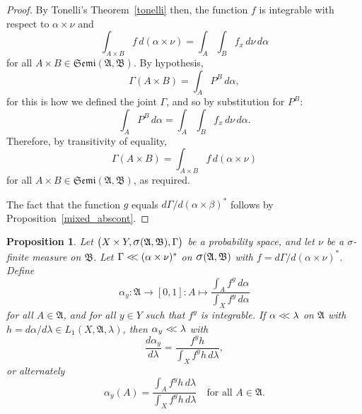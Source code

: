 \documentclass[
twoside=true,
paper=letter,
fontsize=11pt,
pagesize=auto,
leqno,
openany,
headsepline,
overfullrule,
]{scrbook}
\theoremstyle{plain}
\theoremstyle{plain}
\newtheorem{prop}[thm]{Proposition}
\theoremstyle{definition}
\theoremstyle{bfnoteitalic}
\theoremstyle{bfnoteroman}
\newcommand{\sigalg}[1]{\mathfrak{#1}}
\newcommand{\sagb}{\mathop{\hbox{\large{$\sigma$}}}\nolimits}
\newcommand{\textsigma}{\hbox{\large{$\sigma$}}\kern-1pt}
\newcommand{\sigmaalgebra}{\sigalg{A}}
\newcommand{\productsemiring}[2]{\mathfrak{Semi}(#1,#2)}
\newcommand{\productsig}[2]{\sagb(#1,#2)}
\newcommand{\funcf}{f}
\newcommand{\funcg}{g}
\newcommand{\funch}{h}
\newcommand{\function}{f}
\newcommand{\measurespace}{X}
\newcommand{\measurespaceii}{Y}
\newcommand{\abscont}{\mathrel{< \kern-3.5pt <}}
\newcommand{\measnu}{\nu}
\newcommand{\measlambda}{\lambda}
\newcommand{\seti}{A}
\newcommand{\pspace}{\measurespace}%
\newcommand{\sspace}{\measurespaceii}%
\newcommand{\pspaceset}{A}
\newcommand{\sspaceset}{B}
\newcommand{\pspaceelt}{x}
\newcommand{\sspaceelt}{y}
\newcommand{\sspacesig}{\sigalg{B}}
\newcommand{\pspacesig}{\sigalg{A}}
\newcommand{\measonprod}{\Gamma}%
\newcommand{\marginalone}{\alpha}%
\newcommand{\marginaltwo}{\beta}%
\newcommand{\prior}{\marginalone}
\newcommand{\predictive}{\marginaltwo}
\begin{document}
\begin{proof}
By Tonelli's Theorem~\ref{tonelli} then, the function
$\funcf$ is integrable with respect to
$\prior\times\measnu$ and
\[
\int_{\pspaceset\times\sspaceset}
\funcf \,d(\prior\times\measnu)
=
\int_\pspaceset\int_\sspaceset
\function_\pspaceelt\,
d\measnu\,d\prior
\]
for all $\pspaceset\times\sspaceset
\in\productsemiring{\pspacesig}{\sspacesig}.$
By hypothesis,
\[
\measonprod(\pspaceset\times\sspaceset)
=
\int_\pspaceset P^\sspaceset\, d\prior,
\]
for this is how we defined the joint $\measonprod$,
and so by substitution for $P^\sspaceset$:
\[
\int_\pspaceset P^\sspaceset\, d\prior
=
\int_\pspaceset
\int_\sspaceset
\function_\pspaceelt\,
d\measnu\, d\prior.
\]
Therefore, by transitivity of equality,
\[
\measonprod(\pspaceset\times\sspaceset)
=
\int_{\pspaceset\times\sspaceset}
\function \, d(\prior\times\measnu)
\]
for all $\pspaceset\times\sspaceset
\in\productsemiring{\pspacesig}{\sspacesig}$,
as required.

The fact that the function
$\funcg$
equals
$d\measonprod/d(\prior\times\predictive)^*$
follows by Proposition~\ref{mixed_abscont}.
\end{proof}





\begin{prop}
Let
$\bigl(\pspace\times\sspace,
\productsig{\pspacesig}{\sspacesig},
\measonprod\bigr)$
be a probability space, and let
$\measnu$ be a \textsigma-finite measure on $\sspacesig$.
Let  $\measonprod\abscont (\prior\times\measnu)^*$ on
$\productsig{\pspacesig}{\sspacesig}$
with
$\funcf
= d\measonprod/d(\prior\times\measnu)^*$.
Define
\[
\prior_\sspaceelt
:\sigmaalgebra \to [0,1]
:\seti \mapsto
\frac{\int_\pspaceset \function^\sspaceelt \, d\prior}
{\int_\pspace \function^\sspaceelt \, d\prior}
\]
for all $\pspaceset \in \pspacesig$,
and for all $\sspaceelt\in\sspace$ such that
$\function^\sspaceelt$ is integrable.
If $\prior\abscont\measlambda$ on $\pspacesig$ with
$\funch
= d\prior/d\measlambda
\in L_1(\pspace, \pspacesig, \measlambda)$,
then
$\prior_\sspaceelt\abscont\measlambda$ with
\[
\frac
{d \prior_{\sspaceelt}}
{d\measlambda}
=
\frac
{\funcf^{\sspaceelt}\funch}
{\int_{\pspace} \funcf^{\sspaceelt} \funch \, d\measlambda },
\]
or alternately
\[
\prior_{\sspaceelt}(\pspaceset)
=
\frac
{\int_\pspaceset \funcf^{\sspaceelt}\funch \,d\measlambda}
{\int_{\pspace} \funcf^{\sspaceelt} \funch \,d\measlambda}
\quad
\text{for all $\pspaceset\in\pspacesig$.}
\]
\end{prop}
\end{document}
